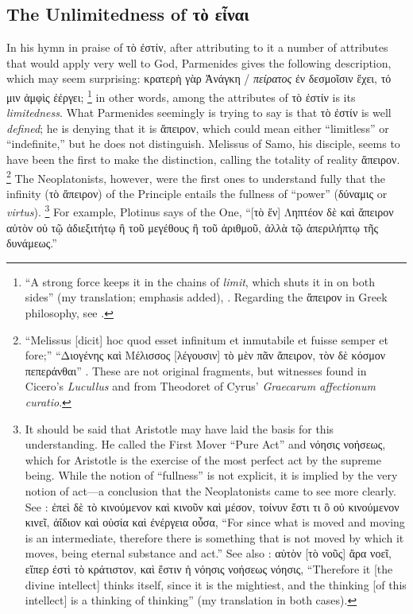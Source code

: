 \subsection{The Unlimitedness of τὸ εἶναι}

In his hymn in praise of τὸ ἐστίν, after attributing to it a number of attributes that would apply very well to God, Parmenides gives the following description, which may seem surprising: κρατερὴ γὰρ Ἀνάγκη / \emph{πείρατος} ἐν δεσμοῖσιν ἔχει, τό μιν ἀμφὶς ἐέργει;%
%
\footnote{“A strong force keeps it in the chains of \emph{limit}, which shuts it in on both sides” (my translation; emphasis added), \cite[DK28b8, l.~30]{dk}. Regarding the ἄπειρον in Greek philosophy, see \cite[42–49]{definance:etre-et-agir}.} in other words, among the attributes of τὸ ἐστίν is its \emph{limitedness}. What Parmenides seemingly is trying to say is that τὸ ἐστίν is well \emph{defined}; he is denying that it is ἄπειρον, which could mean either “limitless” or “indefinite,” but he does not distinguish. Melissus of Samo, his disciple, seems to have been the first to make the distinction, calling the totality of reality ἄπειρον.%
%
\footnote{“Melissus [dicit] hoc quod esset infinitum et inmutabile et fuisse semper et fore;” “Διογένης καὶ Μέλισσος [λέγουσιν] τὸ μὲν πᾶν ἄπειρον, τὸν δὲ κόσμον πεπεράνθαι” \parencite[DK30a8]{dk}. These are not original fragments, but witnesses found in Cicero’s \emph{Lucullus} and from Theodoret of Cyrus’ \emph{Graecarum affectionum curatio}.} The Neoplatonists, however, were the first ones to understand fully that the infinity (τὸ ἄπειρον) of the Principle entails the fullness of “power” (δύναμις or \emph{virtus}).%
%
\footnote{It should be said that Aristotle may have laid the basis for this understanding. He called the First Mover “Pure Act” and νόησις νοήσεως, which for Aristotle is the exercise of the most perfect act by the supreme being. While the notion of “fullness” is not explicit, it is implied by the very notion of act—a conclusion that the Neoplatonists came to see more clearly. See \cite[Λ,~7, 1072a24–25]{aristotle:metaphysics}: ἐπεὶ δὲ τὸ κινούμενον καὶ κινοῦν καὶ μέσον, τοίνυν ἔστι τι ὃ οὐ κινούμενον κινεῖ, ἀΐδιον καὶ οὐσία καὶ ἐνέργεια οὖσα, “For since what is moved and moving is an intermediate, therefore there is something that is not moved by which it moves, being eternal substance and act.” See also \cite[Λ,~9, 1074b34]{aristotle:metaphysics}: αὑτὸν [τὸ νοῦς] ἄρα νοεῖ, εἴπερ ἐστὶ τὸ κράτιστον, καὶ ἔστιν ἡ νόησις νοήσεως νόησις, “Therefore it [the divine intellect] thinks itself, since it is the mightiest, and the thinking [of this intellect] is a thinking of thinking” (my translation in both cases).} For example, Plotinus says of the One, “[τὸ ἕν] Ληπτέον δὲ καὶ ἄπειρον αὐτὸν οὐ τῷ ἀδιεξιτήτῳ ἢ τοῦ μεγέθους ἢ τοῦ ἀριθμοῦ, ἀλλὰ τῷ ἀπεριλήπτῳ τῆς δυνάμεως.”\,%
